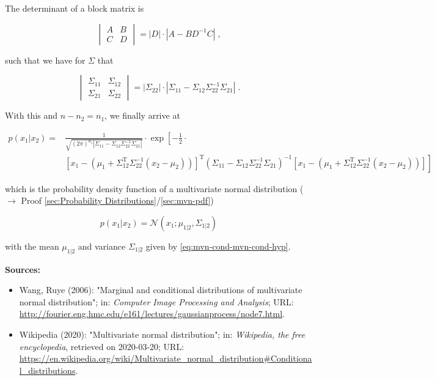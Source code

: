 \documentclass[a4paper,12pt,twoside]{book}
\begin{document}
\vspace{1em}
The determinant of a block matrix is

\begin{equation} \label{eq:mvn-cond-Block-det}
\begin{vmatrix} A & B \\ C & D \end{vmatrix} = |D| \cdot | A - B D^{-1} C | \; ,
\end{equation}

such that we have for $\Sigma$ that

\begin{equation} \label{eq:mvn-cond-Sigma-det}
\begin{vmatrix} \Sigma_{11} & \Sigma_{12} \\ \Sigma_{21} & \Sigma_{22} \end{vmatrix} = |\Sigma_{22}| \cdot | \Sigma_{11} - \Sigma_{12} \Sigma_{22}^{-1} \Sigma_{21} | \; .
\end{equation}

With this and $n - n_2 = n_1$, we finally arrive at

\begin{equation} \label{eq:mvn-cond-mvn-cond-s9}
\begin{split}
p(x_1|x_2) = &\frac{1}{\sqrt{(2 \pi)^{n_1} | \Sigma_{11} - \Sigma_{12} \Sigma_{22}^{-1} \Sigma_{21} |}} \cdot \exp \left[ -\frac{1}{2} \cdot \right. \\
&\! \left. \left[ x_1 - \left( \mu_1 + \Sigma_{12}^\mathrm{T} \Sigma_{22}^{-1} (x_2-\mu_2) \right) \right]^\mathrm{T} (\Sigma_{11} - \Sigma_{12} \Sigma_{22}^{-1} \Sigma_{21})^{-1} \left[ x_1 - \left( \mu_1 + \Sigma_{12}^\mathrm{T} \Sigma_{22}^{-1} (x_2-\mu_2) \right) \right] \right]
\end{split}
\end{equation}

which is the probability density function of a multivariate normal distribution ($\rightarrow$ Proof \ref{sec:Probability Distributions}/\ref{sec:mvn-pdf})

\begin{equation} \label{eq:mvn-cond-mvn-cond-s10}
p(x_1|x_2) = \mathcal{N}(x_1; \mu_{1|2}, \Sigma_{1|2})
\end{equation}

with the mean $\mu_{1 \vert 2}$ and variance $\Sigma_{1 \vert 2}$ given by \eqref{eq:mvn-cond-mvn-cond-hyp}.


\vspace{1em}
\textbf{Sources:}
\begin{itemize}
\item Wang, Ruye (2006): "Marginal and conditional distributions of multivariate normal distribution"; in: \textit{Computer Image Processing and Analysis}; URL: \url{http://fourier.eng.hmc.edu/e161/lectures/gaussianprocess/node7.html}.
\item Wikipedia (2020): "Multivariate normal distribution"; in: \textit{Wikipedia, the free encyclopedia}, retrieved on 2020-03-20; URL: \url{https://en.wikipedia.org/wiki/Multivariate_normal_distribution#Conditional_distributions}.
\end{itemize}
\end{document}
